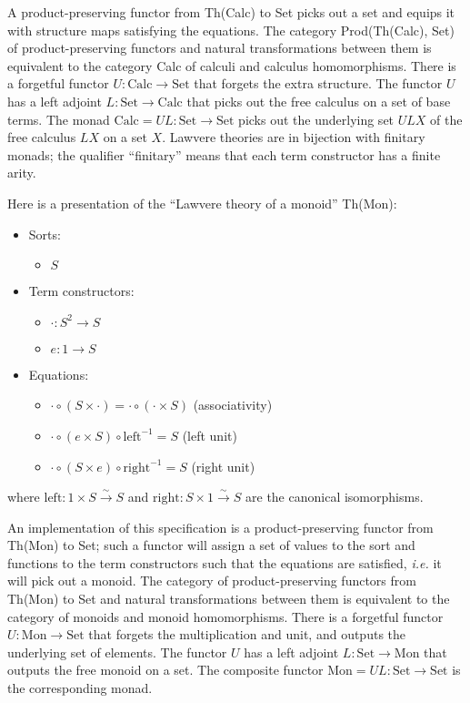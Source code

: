 \documentclass{llncs}
\newcommand{\maps}{\colon}
\newcommand{\Set}{\mathrm{Set}}
\newcommand{\Calc}{\mathrm{Calc}}
\newcommand{\Mon}{\mathrm{Mon}}
\newcommand{\leftu}{\mathrm{left}}
\newcommand{\rightu}{\mathrm{right}}
\begin{document}
A product-preserving functor from Th(Calc) to Set picks out a set and equips it with structure maps satisfying the equations.  The category Prod(Th(Calc), Set) of product-preserving functors and natural transformations between them is equivalent to the category Calc of calculi and calculus homomorphisms.  There is a forgetful functor ${U\maps \Calc \to \Set}$ that forgets the extra structure.  The functor $U$ has a left adjoint ${L\maps \Set \to \Calc}$ that picks out the free calculus on a set of base terms.  The monad $\Calc = UL\maps \Set \to \Set$ picks out the underlying set $ULX$ of the free calculus $LX$ on a set $X$.  Lawvere theories are in bijection with finitary monads; the qualifier ``finitary'' means that each term constructor has a finite arity.

Here is a presentation of the ``Lawvere theory of a monoid'' Th(Mon):\\
\begin{center}
  \begin{itemize}
    \item Sorts:
    \begin{itemize}
      \item $S$
    \end{itemize}
    \item Term constructors:
    \begin{itemize}
      \item $\cdot\maps S^2 \to S$
      \item $e\maps 1 \to S$
    \end{itemize}
    \item Equations:
    \begin{itemize}
      \item $\cdot \circ (S \times \cdot) = \cdot \circ (\cdot \times S)$ (associativity)
      \item $\cdot \circ (e \times S) \circ \leftu^{-1} = S$ (left unit)
      \item $\cdot \circ (S \times e) \circ \rightu^{-1} = S$ (right unit)        
    \end{itemize}
  \end{itemize}
\end{center}
where ${\leftu\maps 1 \times S \stackrel{\sim}{\to} S}$ and ${\rightu\maps S \times 1 \stackrel{\sim}{\to} S}$ are the canonical isomorphisms.

An implementation of this specification is a product-preserving functor from Th(Mon) to Set; such a functor will assign a set of values to the sort and functions to the term constructors such that the equations are satisfied, {\em i.e.} it will pick out a monoid.  The category of product-preserving functors from Th(Mon) to Set and natural transformations between them is equivalent to the category of monoids and monoid homomorphisms.  There is a forgetful functor $U\maps \Mon \to \Set$ that forgets the multiplication and unit, and outputs the underlying set of elements.  The functor $U$ has a left adjoint $L\maps \Set \to \Mon$ that outputs the free monoid on a set.  The composite functor $\Mon = UL\maps \Set \to \Set$ is the corresponding monad.
\end{document}
